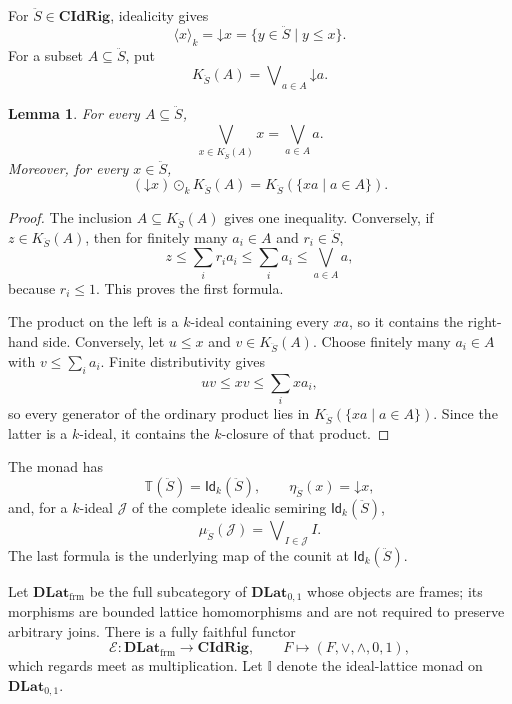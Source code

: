 \documentclass[12pt,leqno]{amsart}
\newcommand{\DLat}{\mathbf{DLat}_{0,1}}
\newcommand{\DLatFrm}{\mathbf{DLat}_{\mathrm{frm}}}
\newcommand{\CIdRig}{\mathbf{CIdRig}}
\newcommand{\Idk}{\mathsf{Id}_{k}}
\newtheorem{lemma}[theorem]{Lemma}
\theoremstyle{definition}
\numberwithin{equation}{section}
\theoremstyle{remark}
\def\leq{\leqslant}
\begin{document}
For \(\ddot S\in\CIdRig\), idealicity gives
\[
\langle x\rangle_k=\mathord\downarrow x
 =\{y\in\ddot S\mid y\leq x\}.
\]
For a subset \(A\subseteq\ddot S\), put
\[
K_{\ddot S}(A)
 =\mathop{\bigvee{}^k}_{a\in A}\mathord\downarrow a.
\]

\begin{lemma}\label{lem:k-generated-supremum}
For every \(A\subseteq\ddot S\),
\[
\bigvee_{x\in K_{\ddot S}(A)}x=\bigvee_{a\in A}a.
\]
Moreover, for every \(x\in\ddot S\),
\[
(\mathord\downarrow x)\odot_k K_{\ddot S}(A)
 =K_{\ddot S}(\{xa\mid a\in A\}).
\]
\end{lemma}

\begin{proof}
The inclusion \(A\subseteq K_{\ddot S}(A)\) gives one inequality. Conversely, if \(z\in K_{\ddot S}(A)\), then for finitely many \(a_i\in A\) and \(r_i\in\ddot S\),
\[
z\leq\sum_i r_i a_i\leq\sum_i a_i\leq\bigvee_{a\in A}a,
\]
because \(r_i\leq1\). This proves the first formula.

The product on the left is a $k$-ideal containing every $xa$, so it contains the right-hand side. Conversely, let \(u\leq x\) and \(v\in K_{\ddot S}(A)\). Choose finitely many \(a_i\in A\) with
\(v\leq\sum_i a_i\). Finite distributivity gives
\[
uv\leq xv\leq\sum_i xa_i,
\]
so every generator of the ordinary product lies in
\(K_{\ddot S}(\{xa\mid a\in A\})\). Since the latter is a $k$-ideal, it contains the $k$-closure of that product.
\end{proof}

The monad has
\[
\mathbb T(\ddot S)=\Idk(\ddot S),
\qquad
\eta_{\ddot S}(x)=\mathord\downarrow x,
\]
and, for a $k$-ideal \(\mathcal J\) of the complete idealic semiring \(\Idk(\ddot S)\),
\[
\mu_{\ddot S}(\mathcal J)
 =\mathop{\bigvee{}^k}_{I\in\mathcal J}I.
\]
The last formula is the underlying map of the counit at \(\Idk(\ddot S)\).

Let \(\DLatFrm\) be the full subcategory of \(\DLat\) whose objects are frames; its morphisms are bounded lattice homomorphisms and are not required to preserve arbitrary joins. There is a fully faithful functor
\[
\mathcal E\colon\DLatFrm\longrightarrow\CIdRig,
\qquad
F\longmapsto(F,\vee,\wedge,0,1),
\]
which regards meet as multiplication. Let \(\mathbb I\) denote the ideal-lattice monad on \(\DLat\).
\end{document}
